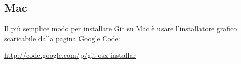 \subsection{Mac}
Il più semplice modo per installare Git su Mac è usare l'installatore grafico scaricabile dalla pagina Google Code:

\url{http://code.google.com/p/git-osx-installar}